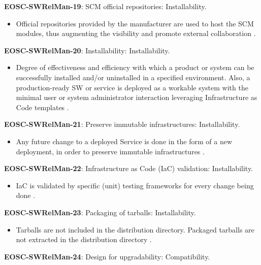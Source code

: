 \textbf{EOSC-SWRelMan-19}: SCM official repositories: Installability.

\begin{itemize}
    \item Official repositories provided by the manufacturer are used to host the SCM modules, thus augmenting the visibility and promote external collaboration \cite{orviz_set_2017}.
\end{itemize}

\textbf{EOSC-SWRelMan-20}: Installability: Installability.

\begin{itemize}
    \item Degree of effectiveness and efficiency with which a product or system can be successfully installed and/or uninstalled in a specified environment. Also, a production-ready SW or service is deployed as a workable system with the minimal user or system administrator interaction leveraging Infrastructure as Code templates \cite{iso_25010_2011_2017,orviz_fernandez_eosc-synergy_2020}.
\end{itemize}

\textbf{EOSC-SWRelMan-21}: Preserve immutable infrastructures: Installability.

\begin{itemize}
    \item Any future change to a deployed Service is done in the form of a new deployment, in order to preserve immutable infrastructures \cite{orviz_fernandez_eosc-synergy_2020}.
\end{itemize}

\textbf{EOSC-SWRelMan-22}: Infrastructure as Code (IaC) validation: Installability.

\begin{itemize}
    \item IaC is validated by specific (unit) testing frameworks for every change being done \cite{orviz_fernandez_eosc-synergy_2020}.
\end{itemize}

\textbf{EOSC-SWRelMan-23}: Packaging of tarballs: Installability.

\begin{itemize}
    \item Tarballs are not included in the distribution directory. Packaged tarballs are not extracted in the distribution directory \cite{raymond_software_2013}.
\end{itemize}

\textbf{EOSC-SWRelMan-24}: Design for upgradability: Compatibility.

